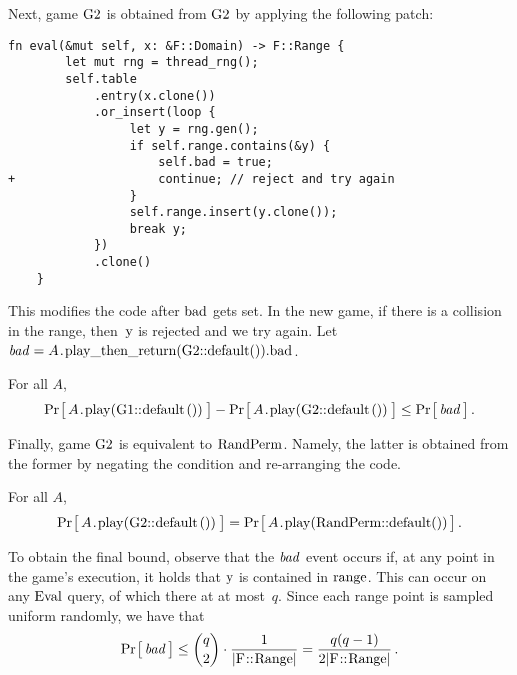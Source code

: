 Next, game $\code{G2}$ is obtained from $\code{G2}$ by applying the following patch:
%
\begin{lstlisting}[style=patch]
    fn eval(&mut self, x: &F::Domain) -> F::Range {
        let mut rng = thread_rng();
        self.table
            .entry(x.clone())
            .or_insert(loop {
                 let y = rng.gen();
                 if self.range.contains(&y) {
                     self.bad = true;
+                    continue; // reject and try again
                 }
                 self.range.insert(y.clone());
                 break y;
            })
            .clone()
    }
\end{lstlisting}
%
This modifies the code after $\code{bad}$ gets set. In the new game, if there
is a collision in the range, then~$\code{y}$ is rejected and we try again.
%
Let $\bad = A\code{.play_then_return(G2::default()).bad}$.
%
\begin{claim}
  For all $A$,
  \[
     \Prob{A\code{.play(G1::default())}} -
     \Prob{A\code{.play(G2::default())}} \leq \Prob{\bad} \,.
  \]
\end{claim}
%

Finally, game $\code{G2}$ is equivalent to
\hyperref[sec/func/ideal]{$\code{RandPerm}$}. Namely, the latter is obtained
from the former by negating the condition and re-arranging the code.
%
\begin{claim}
  For all $A$,
  \[
     \Prob{A\code{.play(G2::default())}} =
     \Prob{A\code{.play(RandPerm::default())}} \,.
  \]
\end{claim}
%

To obtain the final bound, observe that the $\mathit{bad}$ event occurs if, at any
point in the game's execution, it holds that $\code{y}$ is contained in
$\code{range}$.
%
This can occur on any \hyperref[sec/traits]{$\code{Eval}$} query, of which
there at at most~$q$.
%
Since each range point is sampled uniform randomly, we have that
%
\[
  \Prob{\bad} \leq
    \binom{q}{2} \cdot \frac{1}{|\code{F::Range}|} =
    \frac{q(q-1)}{2|\code{F::Range}|} \,.
\]
